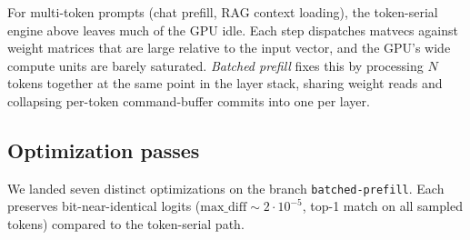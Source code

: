 \documentclass[11pt,a4paper]{article}
\begin{document}
For multi-token prompts (chat prefill, RAG context loading), the
token-serial engine above leaves much of the GPU idle. Each step
dispatches matvecs against weight matrices that are large relative to
the input vector, and the GPU's wide compute units are barely
saturated. \emph{Batched prefill} fixes this by processing $N$ tokens
together at the same point in the layer stack, sharing weight reads
and collapsing per-token command-buffer commits into one per layer.

\subsection{Optimization passes}

We landed seven distinct optimizations on the branch
\texttt{batched-prefill}. Each preserves bit-near-identical logits
($\text{max\_diff} \sim 2 \cdot 10^{-5}$, top-1 match on all sampled
tokens) compared to the token-serial path.
\end{document}
